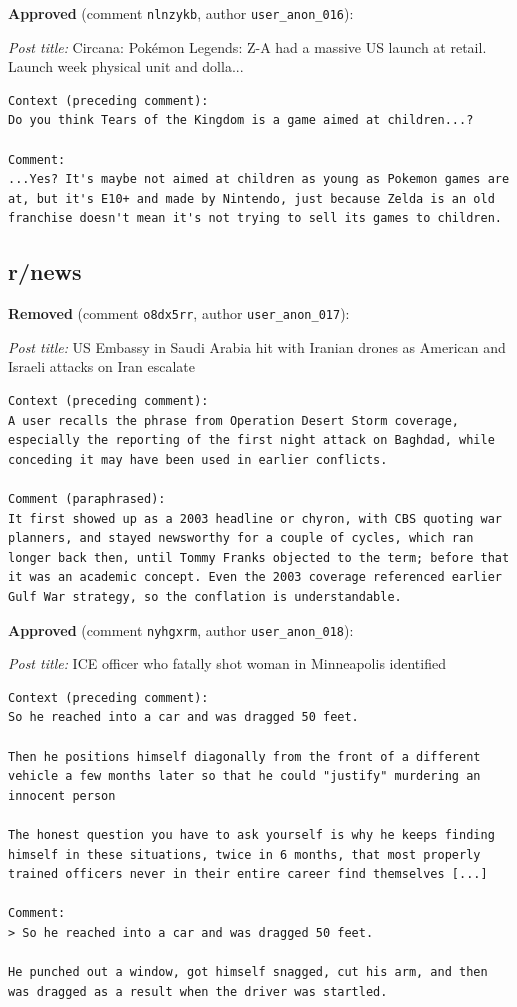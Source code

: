 \noindent\textbf{Approved} (comment \texttt{nlnzykb}, author \texttt{user\_anon\_016}):

\noindent\emph{Post title:} Circana: Pokémon Legends: Z-A had a massive US launch at retail. Launch week physical unit and dolla...

\begin{lstlisting}
Context (preceding comment):
Do you think Tears of the Kingdom is a game aimed at children...?

Comment:
...Yes? It's maybe not aimed at children as young as Pokemon games are at, but it's E10+ and made by Nintendo, just because Zelda is an old franchise doesn't mean it's not trying to sell its games to children.
\end{lstlisting}


\subsection*{r/news}

\noindent\textbf{Removed} (comment \texttt{o8dx5rr}, author \texttt{user\_anon\_017}):

\noindent\emph{Post title:} US Embassy in Saudi Arabia hit with Iranian drones as American and Israeli attacks on Iran escalate

\begin{lstlisting}
Context (preceding comment):
A user recalls the phrase from Operation Desert Storm coverage, especially the reporting of the first night attack on Baghdad, while conceding it may have been used in earlier conflicts.

Comment (paraphrased):
It first showed up as a 2003 headline or chyron, with CBS quoting war planners, and stayed newsworthy for a couple of cycles, which ran longer back then, until Tommy Franks objected to the term; before that it was an academic concept. Even the 2003 coverage referenced earlier Gulf War strategy, so the conflation is understandable.
\end{lstlisting}

\noindent\textbf{Approved} (comment \texttt{nyhgxrm}, author \texttt{user\_anon\_018}):

\noindent\emph{Post title:} ICE officer who fatally shot woman in Minneapolis identified

\begin{lstlisting}
Context (preceding comment):
So he reached into a car and was dragged 50 feet.

Then he positions himself diagonally from the front of a different vehicle a few months later so that he could "justify" murdering an innocent person

The honest question you have to ask yourself is why he keeps finding himself in these situations, twice in 6 months, that most properly trained officers never in their entire career find themselves [...]

Comment:
> So he reached into a car and was dragged 50 feet.

He punched out a window, got himself snagged, cut his arm, and then was dragged as a result when the driver was startled.
\end{lstlisting}


